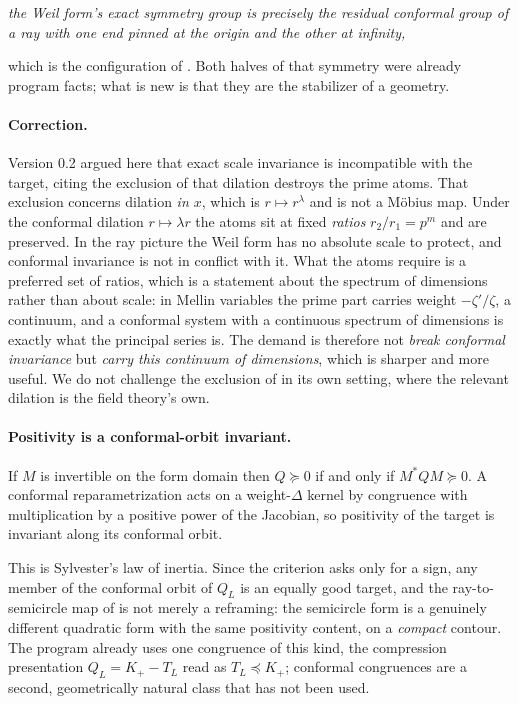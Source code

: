 \begin{center}
\emph{the Weil form's exact symmetry group is precisely the residual conformal
group of a ray with one end pinned at the origin and the other at infinity,}
\end{center}

which is the configuration of \cite{OWL}. Both halves of that symmetry were
already program facts; what is new is that they are the stabilizer of a geometry.

\paragraph{Correction.} Version 0.2 argued here that exact scale invariance is
incompatible with the target, citing the exclusion of \cite{ExclusionMap} that
dilation destroys the prime atoms. That exclusion concerns dilation \emph{in
$x$}, which is $r\mapsto r^\lambda$ and is not a Möbius map. Under the conformal
dilation $r\mapsto\lambda r$ the atoms sit at fixed \emph{ratios}
$r_2/r_1=p^m$ and are preserved. In the ray picture the Weil form has no absolute
scale to protect, and conformal invariance is not in conflict with it. What the
atoms require is a preferred set of ratios, which is a statement about the
spectrum of dimensions rather than about scale: in Mellin variables the prime
part carries weight $-\zeta'/\zeta$, a continuum, and a conformal system with a
continuous spectrum of dimensions is exactly what the principal series is. The
demand is therefore not \emph{break conformal invariance} but \emph{carry this
continuum of dimensions}, which is sharper and more useful. We do not challenge
the exclusion of \cite{ExclusionMap} in its own setting, where the relevant
dilation is the field theory's own.

\paragraph{Positivity is a conformal-orbit invariant.}
\begin{proposition}[Congruence]\label{prop:congruence}
If $M$ is invertible on the form domain then $Q\succeq0$ if and only if
$M^*QM\succeq0$. A conformal reparametrization acts on a weight-$\Delta$ kernel
by congruence with multiplication by a positive power of the Jacobian, so
positivity of the target is invariant along its conformal orbit.
\end{proposition}
This is Sylvester's law of inertia. Since the criterion asks only for a sign, any
member of the conformal orbit of $Q_L$ is an equally good target, and the
ray-to-semicircle map of \cite{OWL} is not merely a reframing: the semicircle
form is a genuinely different quadratic form with the same positivity content, on
a \emph{compact} contour. The program already uses one congruence of this kind,
the compression presentation $Q_L=K_+-T_L$ read as $T_L\preceq K_+$; conformal
congruences are a second, geometrically natural class that has not been used.

